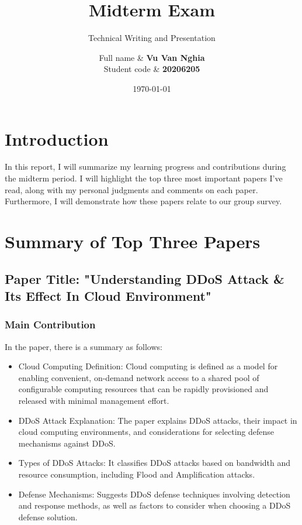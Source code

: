 \documentclass[12pt, twoside]{article}
\title{Midterm Exam}
\subtitle{Technical Writing and Presentation}
\author{
Full name & \textbf{Vu Van Nghia} \\
Student code & \textbf{20206205} \\[1cm]
}
\date{\today}
\begin{document}
\maketitlepage
\tableofcontents
\newpage
\section{Introduction}
In this report, I will summarize my learning progress and contributions during the midterm period. I will highlight the top three most important papers I've read, along with my personal judgments and comments on each paper. Furthermore, I will demonstrate how these papers relate to our group survey.
\section{Summary of Top Three Papers}
\subsection{Paper Title: "Understanding DDoS Attack \& Its Effect In Cloud Environment" \cite{deshmukh2015understanding}}

\subsubsection{Main Contribution}
In the paper, there is a summary as follows:
\begin{itemize}
\item Cloud Computing Definition: Cloud computing is defined as a model for enabling convenient, on-demand network access to a shared pool of configurable computing resources that can be rapidly provisioned and released with minimal management effort.
\item DDoS Attack Explanation: The paper explains DDoS attacks, their impact in cloud computing environments, and considerations for selecting defense mechanisms against DDoS.
\item Types of DDoS Attacks: It classifies DDoS attacks based on bandwidth and resource consumption, including Flood and Amplification attacks.
\item Defense Mechanisms: Suggests DDoS defense techniques involving detection and response methods, as well as factors to consider when choosing a DDoS defense solution.
\end{itemize}
\end{document}
